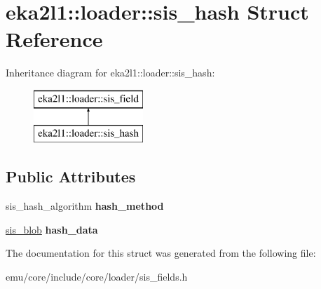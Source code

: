 \hypertarget{structeka2l1_1_1loader_1_1sis__hash}{}\section{eka2l1\+:\+:loader\+:\+:sis\+\_\+hash Struct Reference}
\label{structeka2l1_1_1loader_1_1sis__hash}
Inheritance diagram for eka2l1\+:\+:loader\+:\+:sis\+\_\+hash\+:\begin{figure}[H]
\begin{center}
\leavevmode
\includegraphics[height=2.000000cm]{structeka2l1_1_1loader_1_1sis__hash}
\end{center}
\end{figure}
\subsection*{Public Attributes}
\begin{DoxyCompactItemize}
\item 
\mbox{\label{structeka2l1_1_1loader_1_1sis__hash_af5cddb8a45d7f2e691e3b6230eaa7c8b}} 
sis\+\_\+hash\+\_\+algorithm {\bfseries hash\+\_\+method}
\item 
\mbox{\label{structeka2l1_1_1loader_1_1sis__hash_a746bf90615396ed1bddf0671b5d8b7e8}} 
\mbox{\hyperlink{structeka2l1_1_1loader_1_1sis__blob}{sis\+\_\+blob}} {\bfseries hash\+\_\+data}
\end{DoxyCompactItemize}


The documentation for this struct was generated from the following file\+:\begin{DoxyCompactItemize}
\item 
emu/core/include/core/loader/sis\+\_\+fields.\+h\end{DoxyCompactItemize}
